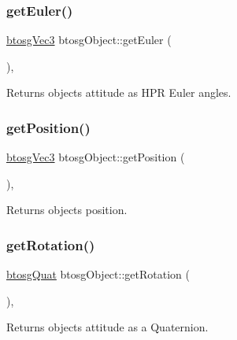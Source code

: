 \subsubsection{\texorpdfstring{get\+Euler()}{getEuler()}}
{\footnotesize\ttfamily \hyperlink{classbtosgVec3}{btosg\+Vec3} btosg\+Object\+::get\+Euler (\begin{DoxyParamCaption}{ }\end{DoxyParamCaption})\hspace{0.3cm}{\ttfamily [inline]}, {\ttfamily [inherited]}}

Returns object\textquotesingle{}s attitude as H\+PR Euler angles. \mbox{\label{classbtosgObject_a3dadd5da8f2a312e44a039446b93d4cd}} 
\subsubsection{\texorpdfstring{get\+Position()}{getPosition()}}
{\footnotesize\ttfamily \hyperlink{classbtosgVec3}{btosg\+Vec3} btosg\+Object\+::get\+Position (\begin{DoxyParamCaption}{ }\end{DoxyParamCaption})\hspace{0.3cm}{\ttfamily [inline]}, {\ttfamily [inherited]}}

Returns object\textquotesingle{}s position. \mbox{\label{classbtosgObject_a3b825999ad3a51bde743d4085ff19dae}} 
\subsubsection{\texorpdfstring{get\+Rotation()}{getRotation()}}
{\footnotesize\ttfamily \hyperlink{classbtosgQuat}{btosg\+Quat} btosg\+Object\+::get\+Rotation (\begin{DoxyParamCaption}{ }\end{DoxyParamCaption})\hspace{0.3cm}{\ttfamily [inline]}, {\ttfamily [inherited]}}

Returns object\textquotesingle{}s attitude as a Quaternion. \mbox{\label{classbtosgObject_a91838b8235579da178fcc06e6d3d47f3}} 
